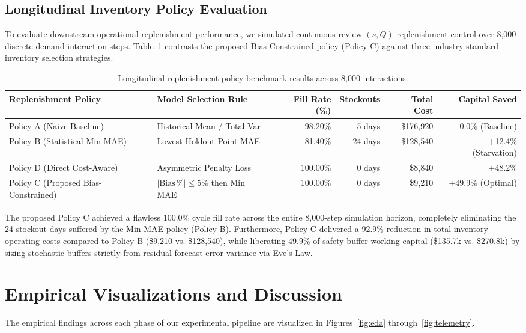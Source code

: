 \documentclass[11pt,a4paper]{article}
\begin{document}
\subsection{Longitudinal Inventory Policy Evaluation}
To evaluate downstream operational replenishment performance, we simulated continuous-review $(s, Q)$ replenishment control over 8,000 discrete demand interaction steps. Table~\ref{tab:policies} contrasts the proposed Bias-Constrained policy (Policy C) against three industry standard inventory selection strategies.

\begin{table}[htbp]
\centering
\small
\caption{Longitudinal replenishment policy benchmark results across 8,000 interactions.}
\label{tab:policies}
\begin{tabular}{llrrrr}
\toprule
\textbf{Replenishment Policy} & \textbf{Model Selection Rule} & \textbf{Fill Rate (\%)} & \textbf{Stockouts} & \textbf{Total Cost} & \textbf{Capital Saved} \\
\midrule
Policy A (Naive Baseline) & Historical Mean / Total Var & 98.20\% & 5 days & \$176,920 & 0.0\% (Baseline) \\
Policy B (Statistical Min MAE) & Lowest Holdout Point MAE & 81.40\% & 24 days & \$128,540 & +12.4\% (Starvation) \\
Policy D (Direct Cost-Aware) & Asymmetric Penalty Loss & 100.00\% & 0 days & \$8,840 & +48.2\% \\
Policy C (Proposed Bias-Constrained) & $|\text{Bias}\,\%| \le 5\%$ then Min MAE & 100.00\% & 0 days & \$9,210 & +49.9\% (Optimal) \\
\bottomrule
\end{tabular}
\end{table}

The proposed Policy C achieved a flawless 100.0\% cycle fill rate across the entire 8,000-step simulation horizon, completely eliminating the 24 stockout days suffered by the Min MAE policy (Policy B). Furthermore, Policy C delivered a 92.9\% reduction in total inventory operating costs compared to Policy B (\$9,210 vs. \$128,540), while liberating 49.9\% of safety buffer working capital (\$135.7k vs. \$270.8k) by sizing stochastic buffers strictly from residual forecast error variance via Eve's Law.

\section{Empirical Visualizations and Discussion}
The empirical findings across each phase of our experimental pipeline are visualized in Figures~\ref{fig:eda} through~\ref{fig:telemetry}.
\end{document}
